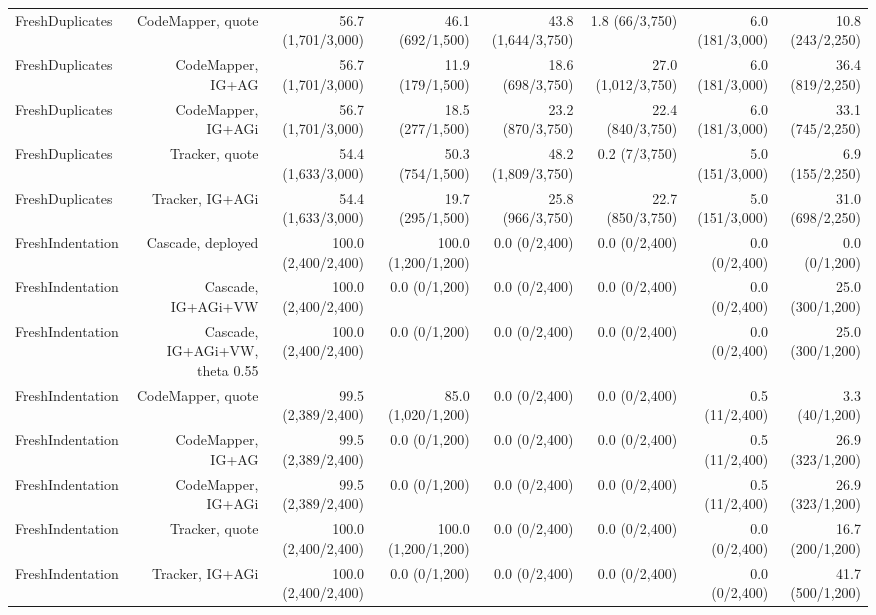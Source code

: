 \begin{table}[t]
{\begin{tabular}{@{}lrrrrrrr@{}}
FreshDuplicates & CodeMapper, quote & 56.7 (1,701/3,000) & 46.1 (692/1,500) & 43.8 (1,644/3,750) & 1.8 (66/3,750) & 6.0 (181/3,000) & 10.8 (243/2,250) \\
FreshDuplicates & CodeMapper, IG+AG & 56.7 (1,701/3,000) & 11.9 (179/1,500) & 18.6 (698/3,750) & 27.0 (1,012/3,750) & 6.0 (181/3,000) & 36.4 (819/2,250) \\
FreshDuplicates & CodeMapper, IG+AGi & 56.7 (1,701/3,000) & 18.5 (277/1,500) & 23.2 (870/3,750) & 22.4 (840/3,750) & 6.0 (181/3,000) & 33.1 (745/2,250) \\
FreshDuplicates & Tracker, quote & 54.4 (1,633/3,000) & 50.3 (754/1,500) & 48.2 (1,809/3,750) & 0.2 (7/3,750) & 5.0 (151/3,000) & 6.9 (155/2,250) \\
FreshDuplicates & Tracker, IG+AGi & 54.4 (1,633/3,000) & 19.7 (295/1,500) & 25.8 (966/3,750) & 22.7 (850/3,750) & 5.0 (151/3,000) & 31.0 (698/2,250) \\
FreshIndentation & Cascade, deployed & 100.0 (2,400/2,400) & 100.0 (1,200/1,200) & 0.0 (0/2,400) & 0.0 (0/2,400) & 0.0 (0/2,400) & 0.0 (0/1,200) \\
FreshIndentation & Cascade, IG+AGi+VW & 100.0 (2,400/2,400) & 0.0 (0/1,200) & 0.0 (0/2,400) & 0.0 (0/2,400) & 0.0 (0/2,400) & 25.0 (300/1,200) \\
FreshIndentation & Cascade, IG+AGi+VW, theta 0.55 & 100.0 (2,400/2,400) & 0.0 (0/1,200) & 0.0 (0/2,400) & 0.0 (0/2,400) & 0.0 (0/2,400) & 25.0 (300/1,200) \\
FreshIndentation & CodeMapper, quote & 99.5 (2,389/2,400) & 85.0 (1,020/1,200) & 0.0 (0/2,400) & 0.0 (0/2,400) & 0.5 (11/2,400) & 3.3 (40/1,200) \\
FreshIndentation & CodeMapper, IG+AG & 99.5 (2,389/2,400) & 0.0 (0/1,200) & 0.0 (0/2,400) & 0.0 (0/2,400) & 0.5 (11/2,400) & 26.9 (323/1,200) \\
FreshIndentation & CodeMapper, IG+AGi & 99.5 (2,389/2,400) & 0.0 (0/1,200) & 0.0 (0/2,400) & 0.0 (0/2,400) & 0.5 (11/2,400) & 26.9 (323/1,200) \\
FreshIndentation & Tracker, quote & 100.0 (2,400/2,400) & 100.0 (1,200/1,200) & 0.0 (0/2,400) & 0.0 (0/2,400) & 0.0 (0/2,400) & 16.7 (200/1,200) \\
FreshIndentation & Tracker, IG+AGi & 100.0 (2,400/2,400) & 0.0 (0/1,200) & 0.0 (0/2,400) & 0.0 (0/2,400) & 0.0 (0/2,400) & 41.7 (500/1,200) \\
\bottomrule
\end{tabular}
}
\end{table}

